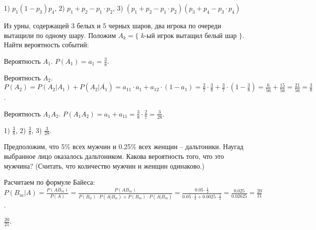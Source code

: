 \begin{result}  
  1) $p_1 (1 - p_3)p_4$, 2) $p_1 + p_2 - p_1 \cdot p_2$, 3) $(p_1 + p_2 - p_1 \cdot p_2) (p_3 + p_4 - p_3 \cdot p_4)$
\end{result}

\medskip
\begin{task}{11}
  Из урны, содержащей 3 белых и 5 черных шаров, два игрока по очереди вытащили по одному шару. Положим
  $A_k = \{$ $k$-ый игрок вытащил белый шар $\}$. Найти вероятность событий:
\end{task}

\begin{subtask}{1}
  Вероятность $A_1$. $P(A_1) = a_1 = \frac{3}{8}$.
\end{subtask}

\begin{subtask}{2}
Вероятность $A_2$. $P(A_2) = P(A_2 | A_1) + P(A_2 | \overline{A_1}) = a_{11} \cdot  a_1  + a_{12} \cdot (1 - a_1) =
\frac{2}{7} \cdot \frac{3}{8} + \frac{3}{7} \cdot (1 - \frac{3}{8}) = \frac{6}{56} + \frac{15}{56} = \frac{21}{56} = \frac{3}{8}$.
\end{subtask}

\begin{subtask}{3}
Вероятность $ A_1 A_2$. $P(A_1A_2) = a_1 + a_{11} = \frac{3}{8} \cdot \frac{2}{7} = \frac{3}{28}$.
\end{subtask}

\begin{result}
  1) $\frac{3}{8}$, 2) $\frac{3}{8}$, 3) $\frac{3}{28}$.
\end{result}

\medskip
\begin{task}{15}
  Предположим, что 5\% всех мужчин и 0.25\% всех женщин -- дальтоники. Наугад выбранное лицо оказалось
  дальтоником. Какова вероятность того, что это мужчина? (Считать, что количество мужчин и женщин одинаково.)
\end{task}

\begin{solution}
  Расчитаем по формуле Байеса: $P(B_m | A) = \frac{P(AB_m)}{P(A)} = \frac{P(AB_m)}{P(B_w) \cdot P(A | B_w) + P(B_m) \cdot P(A | B_m)} =
  \frac{0.05 \cdot \frac{1}{2}}{0.05 \cdot \frac{1}{2} + 0.0025 \cdot \frac{1}{2}} = \frac{0.025}{0.02625} = \frac{20}{21}$.
\end{solution}

\begin{result}
  $\frac{20}{21}$.
\end{result}



